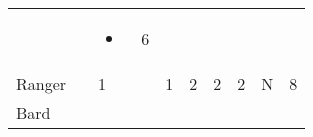 \documentclass[12pt]{article}
\begin{document}
\begin{longtable}[]{@{}llllllllll@{}}
\begin{minipage}[t]{0.06\columnwidth}\raggedright\strut
\strut\end{minipage} &
\begin{minipage}[t]{0.06\columnwidth}\raggedright\strut
\strut\end{minipage} &
\begin{minipage}[t]{0.07\columnwidth}\raggedright\strut
\begin{itemize}
\item
\end{itemize}
\strut\end{minipage} &
\begin{minipage}[t]{0.08\columnwidth}\raggedright\strut
6
\strut\end{minipage}\tabularnewline
\begin{minipage}[t]{0.13\columnwidth}\raggedright\strut
Ranger
\strut\end{minipage} &
\begin{minipage}[t]{0.06\columnwidth}\raggedright\strut
\strut\end{minipage} &
\begin{minipage}[t]{0.06\columnwidth}\raggedright\strut
1
\strut\end{minipage} &
\begin{minipage}[t]{0.06\columnwidth}\raggedright\strut
\strut\end{minipage} &
\begin{minipage}[t]{0.06\columnwidth}\raggedright\strut
1
\strut\end{minipage} &
\begin{minipage}[t]{0.06\columnwidth}\raggedright\strut
2
\strut\end{minipage} &
\begin{minipage}[t]{0.06\columnwidth}\raggedright\strut
2
\strut\end{minipage} &
\begin{minipage}[t]{0.06\columnwidth}\raggedright\strut
2
\strut\end{minipage} &
\begin{minipage}[t]{0.07\columnwidth}\raggedright\strut
N
\strut\end{minipage} &
\begin{minipage}[t]{0.08\columnwidth}\raggedright\strut
8
\strut\end{minipage}\tabularnewline
\begin{minipage}[t]{0.13\columnwidth}\raggedright\strut
Bard
\strut\end{minipage} &
\begin{minipage}[t]{0.06\columnwidth}\raggedright\strut

\end{minipage}
\end{longtable}
\end{document}
